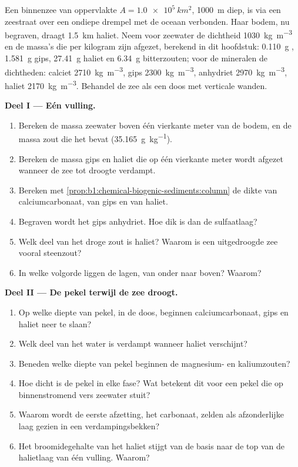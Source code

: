 \begin{problem}
\label{pb:b1:chemical-biogenic-sediments:1}
Een binnenzee van oppervlakte $A = \qty{1.0e5}{km^2}$, \qty{1000}{m} diep, is via een zeestraat over een ondiepe drempel met de oceaan verbonden. Haar bodem, nu begraven, draagt \qty{1.5}{km} haliet. Neem voor zeewater de dichtheid \qty{1030}{kg.m^{-3}} en de massa's die per kilogram zijn afgezet, berekend in dit hoofdstuk: \qty{0.110}{g} , \qty{1.581}{g} gips, \qty{27.41}{g} haliet en \qty{6.34}{g} bitterzouten; voor de mineralen de dichtheden: calciet \qty{2710}{kg.m^{-3}}, gips \qty{2300}{kg.m^{-3}}, anhydriet \qty{2970}{kg.m^{-3}}, haliet \qty{2170}{kg.m^{-3}}. Behandel de zee als een doos met verticale wanden.

\medskip
\noindent\textbf{Deel I --- Eén vulling.}
\begin{enumerate}
  \item Bereken de massa zeewater boven één vierkante meter van de bodem, en de massa zout die het bevat (\qty{35.165}{g.kg^{-1}}).
  \item Bereken de massa gips en haliet die op één vierkante meter wordt afgezet wanneer de zee tot droogte verdampt.
  \item Bereken met \cref{prop:b1:chemical-biogenic-sediments:column} de dikte van calciumcarbonaat, van gips en van haliet.
  \item Begraven wordt het gips anhydriet. Hoe dik is dan de sulfaatlaag?
  \item Welk deel van het droge zout is haliet? Waarom is een uitgedroogde zee vooral steenzout?
  \item In welke volgorde liggen de lagen, van onder naar boven? Waarom?
\end{enumerate}

\noindent\textbf{Deel II --- De pekel terwijl de zee droogt.}
\begin{enumerate}[resume]
  \item Op welke diepte van pekel, in de doos, beginnen calciumcarbonaat, gips en haliet neer te slaan?
  \item Welk deel van het water is verdampt wanneer haliet verschijnt?
  \item Beneden welke diepte van pekel beginnen de magnesium- en kaliumzouten?
  \item Hoe dicht is de pekel in elke fase? Wat betekent dit voor een pekel die op binnenstromend vers zeewater stuit?
  \item Waarom wordt de eerste afzetting, het carbonaat, zelden als afzonderlijke laag gezien in een verdampingsbekken?
  \item Het broomidegehalte van het haliet stijgt van de basis naar de top van de halietlaag van één vulling. Waarom?
\end{enumerate}


\end{problem}
